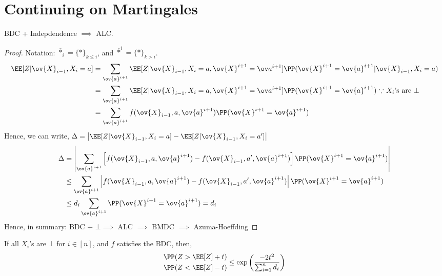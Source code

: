 \chapter{Continuing on Martingales}

\begin{prop}
BDC + Indepdendence $\implies$ ALC.    
\end{prop}
\begin{proof}
Notation: $\overline{*}_i = \{*\}_{k\leq i}$, and $\overline{*}^i = \{*\}_{k > i}$. 
\begin{align*}
\EE[Z | \ov{X}_{i-1}, X_i = a] &= \sum_{\ov{a}^{i+1}} \EE[Z | \ov{X}_{i-1}, X_i=a, \ov{X}^{i+1}=\ov a^{i+1}] \PP(\ov{X}^{i+1} = \ov{a}^{i+1} | \ov{X}_{i-1}, X_i=a) \\
&= \sum_{\ov{a}^{i+1}} \EE[Z | \ov{X}_{i-1}, X_i=a, \ov{X}^{i+1}=\ov a^{i+1}] \PP(\ov{X}^{i+1} = \ov{a}^{i+1}) \text{ $\because$ $X_i$'s are $\bot$} \\
&=  \sum_{\ov{a}^{i+1}} f(\ov{X}_{i-1}, a, \ov{a}^{i+1}) \PP(\ov{X}^{i+1} = \ov{a}^{i+1})
\end{align*}
Hence, we can write, $\Delta=\left|\EE[Z|\ov{X}_{i-1},X_i=a] - \EE[Z|\ov{X}_{i-1},X_i=a']\right|$
\begin{align*}
\Delta&=\left|\sum_{\ov{a}^{i+1}} \left[f(\ov{X}_{i-1}, a, \ov{a}^{i+1}) - f(\ov{X}_{i-1}, a', \ov{a}^{i+1})\right] \PP(\ov{X}^{i+1} = \ov{a}^{i+1})\right| \\
&\leq \sum_{\ov{a}^{i+1}} \left|f(\ov{X}_{i-1}, a, \ov{a}^{i+1}) - f(\ov{X}_{i-1}, a', \ov{a}^{i+1})  \right| \PP(\ov{X}^{i+1} = \ov{a}^{i+1}) \\
&\leq d_i \sum_{\ov{a}^{i+1}}\PP(\ov{X}^{i+1} = \ov{a}^{i+1}) = d_i
\end{align*}
Hence, in summary: BDC + $\bot \implies $ ALC $\implies$ BMDC $\implies$ Azuma-Hoeffding
\end{proof}
\begin{theorem}
If all $X_i$'s are $\bot$ for $i \in [n]$, and $f$ satisfies the BDC, then,
\begin{equation}
\begin{split}
    &\PP(Z > \EE[Z] + t) \\ 
    &\PP(Z < \EE[Z]-t)
\end{split}
\leq \exp\left(\frac{-2t^2}{\sum_{i=1}^nd_i}\right)
\end{equation}
\end{theorem}
